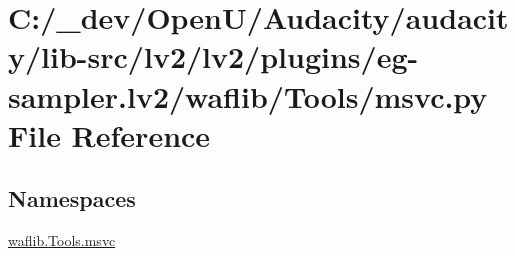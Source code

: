 \hypertarget{lv2_2plugins_2eg-sampler_8lv2_2waflib_2_tools_2msvc_8py}{}\section{C\+:/\+\_\+dev/\+Open\+U/\+Audacity/audacity/lib-\/src/lv2/lv2/plugins/eg-\/sampler.lv2/waflib/\+Tools/msvc.py File Reference}
\label{lv2_2plugins_2eg-sampler_8lv2_2waflib_2_tools_2msvc_8py}
\subsection*{Namespaces}
\begin{DoxyCompactItemize}
\item 
 \hyperlink{namespacewaflib_1_1_tools_1_1msvc}{waflib.\+Tools.\+msvc}
\end{DoxyCompactItemize}
